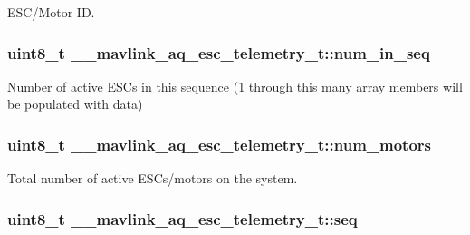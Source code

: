 E\+S\+C/\+Motor I\+D. 

\hypertarget{struct____mavlink__aq__esc__telemetry__t_ad480b6bb106d4ae8507ad5798c5fc67a}{
\subsubsection[{num\+\_\+in\+\_\+seq}]{\setlength{\rightskip}{0pt plus 5cm}uint8\+\_\+t \+\_\+\+\_\+mavlink\+\_\+aq\+\_\+esc\+\_\+telemetry\+\_\+t\+::num\+\_\+in\+\_\+seq}}\label{struct____mavlink__aq__esc__telemetry__t_ad480b6bb106d4ae8507ad5798c5fc67a}


Number of active E\+S\+Cs in this sequence (1 through this many array members will be populated with data) 

\hypertarget{struct____mavlink__aq__esc__telemetry__t_ad1fcb50c88938466376d26ee77a1093b}{
\subsubsection[{num\+\_\+motors}]{\setlength{\rightskip}{0pt plus 5cm}uint8\+\_\+t \+\_\+\+\_\+mavlink\+\_\+aq\+\_\+esc\+\_\+telemetry\+\_\+t\+::num\+\_\+motors}}\label{struct____mavlink__aq__esc__telemetry__t_ad1fcb50c88938466376d26ee77a1093b}


Total number of active E\+S\+Cs/motors on the system. 

\hypertarget{struct____mavlink__aq__esc__telemetry__t_ab57abc6183bead136f6198e15f97134b}{
\subsubsection[{seq}]{\setlength{\rightskip}{0pt plus 5cm}uint8\+\_\+t \+\_\+\+\_\+mavlink\+\_\+aq\+\_\+esc\+\_\+telemetry\+\_\+t\+::seq}}\label{struct____mavlink__aq__esc__telemetry__t_ab57abc6183bead136f6198e15f97134b}


